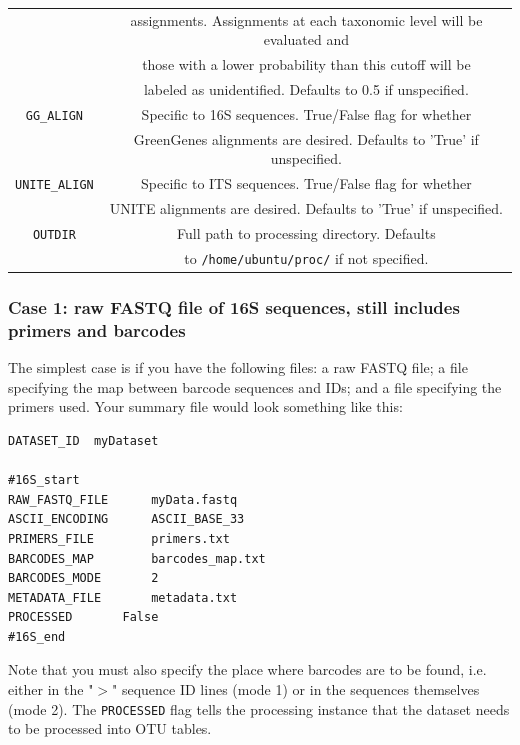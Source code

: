 \documentclass[11pt, oneside]{article}   	%
\begin{document}
\begin{table}[h!]
\begin{center}
\begin{tabular}{| c | c |}
	& assignments.  Assignments at each taxonomic level will be evaluated and \\
	& those with a lower probability than this cutoff will be \\
	& labeled as unidentified. Defaults to 0.5 if unspecified. \\
	\hline
	{\tt GG\_ALIGN} & Specific to 16S sequences.  True/False flag for whether \\
	& GreenGenes alignments are desired.  Defaults to 'True' if unspecified. \\
	\hline
	{\tt UNITE\_ALIGN} & Specific to ITS sequences.  True/False flag for whether \\
	& UNITE alignments are desired.  Defaults to 'True' if unspecified. \\
	\hline
	{\tt OUTDIR} & Full path to processing directory. Defaults \\
	& to {\tt /home/ubuntu/proc/} if not specified. \\
    \end{tabular}
  \end{center}
\end{table}


\subsubsection{Case 1: raw FASTQ file of 16S sequences, still includes primers and barcodes}
The simplest case is if you have the following files: a raw FASTQ file; a file specifying the map between barcode sequences and IDs; and a file specifying the primers used.  Your summary file would look something like this:

\begin{verbatim}
DATASET_ID	myDataset

#16S_start
RAW_FASTQ_FILE		myData.fastq
ASCII_ENCODING		ASCII_BASE_33
PRIMERS_FILE		primers.txt
BARCODES_MAP		barcodes_map.txt
BARCODES_MODE		2
METADATA_FILE		metadata.txt
PROCESSED		False
#16S_end
\end{verbatim}
Note that you must also specify the place where barcodes are to be found, i.e. either in the "$>$" sequence ID lines (mode 1) or in the sequences themselves (mode 2).  The {\tt PROCESSED} flag tells the processing instance that the dataset needs to be processed into OTU tables.
\end{document}
